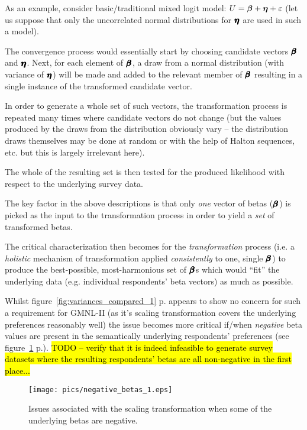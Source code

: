 \documentclass[12pt,a4paper]{article}
\begin{document}
As an example, consider basic/traditional mixed logit model: \(U=\hm{\beta}+\hm{\eta} + \varepsilon\) (let us suppose that only the uncorrelated normal distributions for \(\pmb{\hm{\eta}}\)  are used in such a model).

The convergence process would essentially start by choosing candidate vectors \(\pmb{\hm{\beta}}\) and \(\pmb{\hm{\eta}}\). Next, for each element of \(\pmb{\hm{\beta}}\), a draw from a normal distribution (with variance of \(\pmb{\hm{\eta}}\)) will be made and added to the relevant member of \(\pmb{\hm{\beta}}\) resulting in a single instance of the transformed candidate vector. 

In order to generate a whole set of such vectors, the transformation process is repeated many times where candidate vectors do not change (but the values produced by the draws from the distribution obviously vary -- the distribution draws themselves may be done at random or with the help of Halton sequences, etc. but this is largely irrelevant here).

The whole of the resulting set is then tested for the produced likelihood with respect to the underlying survey data.

The key factor in the above descriptions is that only \textit{one} vector of betas (\(\pmb{\hm{\beta}}\)) is picked as the input to the transformation process in order to yield a \textit{set} of transformed betas.

The critical characterization then becomes for the \textit{transformation} process (i.e. a \textit{holistic} mechanism of transformation applied \textit{consistently} to one, single \(\pmb{\hm{\beta}}\)) to produce the best-possible, most-harmonious set of \(\pmb{\hm{\beta}}\)s which would ``fit'' the underlying data (e.g. individual respondents' beta vectors) as much as possible.

Whilst figure~\ref{fig:variances_compared_1} p.\pageref{fig:variances_compared_1} appears to show no concern for such a requirement for GMNL-II (as it's scaling transformation covers the underlying preferences reasonably well) the issue becomes more critical if/when \textit{negative} beta values are present in the semantically underlying respondents' preferences (see figure~\ref{fig:negative_betas_1} p.\pageref{fig:negative_betas_1}). \hl{TODO -- verify that it is indeed infeasible to generate survey datasets where the resulting respondents' betas are all non-negative in the first place...}


\begin{figure}[H]
\begin{framed}
\texttt{[image: pics/negative\_betas\_1.eps]}


\caption{Issues associated with the scaling transformation when some of the underlying betas are negative.} 

\label{fig:negative_betas_1}
\end{framed}
\end{figure}
\end{document}
